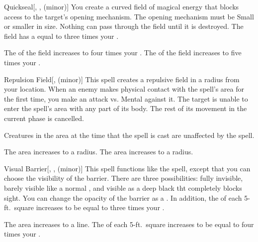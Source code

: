 \lowercase{\hypertarget{spell:Quickseal}{}}\label{spell:Quickseal}
\begin{freeability}[Rank 3]{\hypertarget{spell:Quickseal}{Quickseal}}[, ,  (minor)]
You create a curved field of magical energy that blocks access to the target's opening mechanism.
The opening mechanism must be Small or smaller in size.
Nothing can pass through the field until it is destroyed.
The field has a  equal to three times your .

\rankline
{} The  of the field increases to four times your .
 The  of the field increases to five times your .
\end{freeability}
\vspace{0.25em}



\lowercase{\hypertarget{spell:Repulsion Field}{}}\label{spell:Repulsion Field}
\begin{freeability}[Rank 3]{\hypertarget{spell:Repulsion Field}{Repulsion Field}}[,  (minor)]
This spell creates a repulsive field in a \areamed radius  from your location.
When an enemy makes physical contact with the spell's area for the first time, you make an attack vs. Mental against it.
\hit The target is unable to enter the spell's area with any part of its body.
The rest of its movement in the current phase is cancelled.

Creatures in the area at the time that the spell is cast are unaffected by the spell.

\rankline
{} The area increases to a \arealarge radius.
 The area increases to a \areahuge radius.
\end{freeability}
\vspace{0.25em}



\lowercase{\hypertarget{spell:Visual Barrier}{}}\label{spell:Visual Barrier}
\begin{freeability}[Rank 3]{\hypertarget{spell:Visual Barrier}{Visual Barrier}}[, ,  (minor)]
\targetrule
This spell functions like the  spell, except that you can choose the visibility of the barrier.
There are three possibilities: fully invisible, barely visible like a normal , and visible as a deep black tht completely blocks sight.
You can change the opacity of the barrier as a .
In addition, the  of each 5-ft.\ square increases to be equal to three times your .

 The area increases to a \arealarge line.
 The  of each 5-ft.\ square increases to be equal to four times your .
\end{freeability}
\vspace{0.25em}



